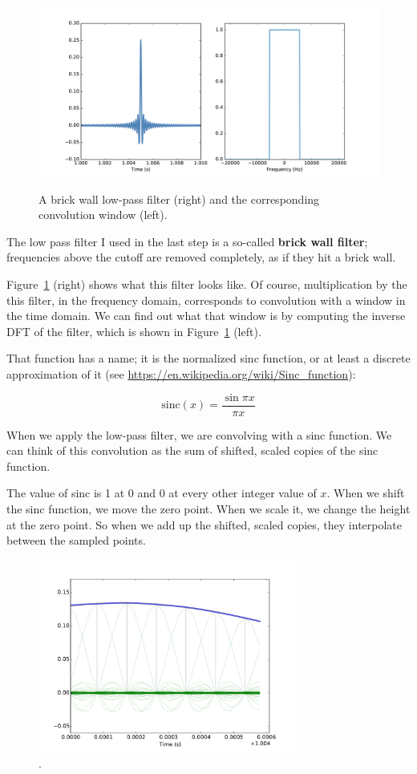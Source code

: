 \documentclass[12pt]{book}
\begin{document}
\begin{figure}
\centerline{\includegraphics[height=2.5in]{figs/sampling6.pdf}}
\caption{A brick wall low-pass filter (right) and the corresponding
convolution window (left).}
\label{fig.sampling6}
\end{figure}

The low pass filter I used in the last step is a so-called {\bf brick
  wall filter}; frequencies above the cutoff are removed completely,
as if they hit a brick wall.

Figure~\ref{fig.sampling6} (right) shows what this filter looks like.
Of course, multiplication by the this filter, in the frequency domain,
corresponds to convolution with a window in the time domain.  We can
find out what that window is by computing the inverse DFT of the
filter, which is shown in Figure~\ref{fig.sampling6} (left).

That function has a name; it is the normalized sinc function, or at
least a discrete approximation of it (see
\url{https://en.wikipedia.org/wiki/Sinc_function}):

\[ \mathrm{sinc}(x) = \frac{\sin \pi x}{\pi x} \]

When we apply the low-pass filter, we are convolving with a sinc
function.  We can think of this convolution as the sum of shifted,
scaled copies of the sinc function.  

The value of sinc is 1 at 0 and 0 at every other integer
value of $x$.  When we shift the sinc function, we move the zero point.
When we scale it, we change the height at the zero point.
So when we add up the shifted, scaled copies, they interpolate
between the sampled points.

\begin{figure}
\centerline{\includegraphics[height=2.5in]{figs/sampling8.pdf}}
\caption{.}
\label{fig.sampling8}
\end{figure}
\end{document}
